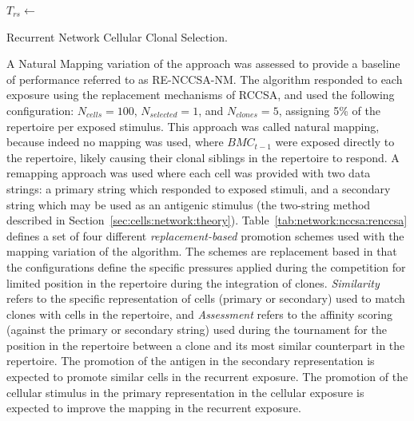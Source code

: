 \begin{algorithm}[htp]
  \SetLine
	
	$T_{rs} \leftarrow$ \;		
	\;	
	\;
	
	\caption{Recurrent Network Cellular Clonal Selection.}
	\label{alg:cells:nccsa:recurrent}
\end{algorithm}	

A Natural Mapping variation of the approach was assessed to provide a baseline of performance referred to as RE-NCCSA-NM. The algorithm responded to each exposure using the replacement mechanisms of RCCSA, and used the following configuration: $N_{cells}=100$, $N_{selected}=1$, and $N_{clones}=5$, assigning 5\% of the repertoire per exposed stimulus. This approach was called natural mapping, because indeed no mapping was used, where $BMC_{t-1}$ were exposed directly to the repertoire, likely causing their clonal siblings in the repertoire to respond.
A remapping approach was used where each cell was provided with two data strings: a primary string which responded to exposed stimuli, and a secondary string which may be used as an antigenic stimulus (the two-string method described in Section~\ref{sec:cells:network:theory}).
Table~\ref{tab:network:nccsa:renccsa} defines a set of four different \emph{replacement-based} promotion schemes used with the mapping variation of the algorithm. The schemes are replacement based in that the configurations define the specific pressures applied during the competition for limited position in the repertoire during the integration of clones. \emph{Similarity} refers to the specific representation of cells (primary or secondary) used to match clones with cells in the repertoire, and \emph{Assessment} refers to the affinity scoring (against the primary or secondary string) used during the tournament for the position in the repertoire between a clone and its most similar counterpart in the repertoire.
The promotion of the antigen in the secondary representation is expected to promote similar cells in the recurrent exposure. The promotion of the cellular stimulus in the primary representation in the cellular exposure is expected to improve the mapping in the recurrent exposure. 

